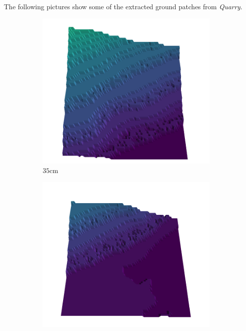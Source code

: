 \documentclass[../document.tex]{subfiles}
\begin{document}
The following pictures show some of the extracted ground patches from \emph{Quarry}.
\begin{figure}[H]
    \centering
    \begin{subfigure}[b]{0.19\textwidth}
    \includegraphics[width=\linewidth]{../img/5/quarry/all/best/35-patch-3d-majavi-colormap-0.png}
    \caption{$35$cm}
    \end{subfigure}
    \begin{subfigure}[b]{0.19\textwidth}
    \includegraphics[width=\linewidth]{../img/5/quarry/all/best/38-patch-3d-majavi-colormap-1.png}

\end{subfigure}
\end{figure}
\end{document}
